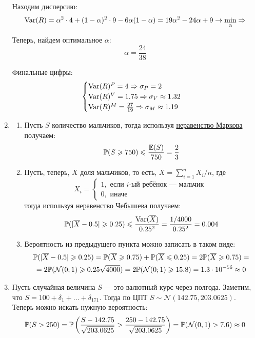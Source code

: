 \documentclass[12pt, a4paper]{article}\usepackage[]{graphicx}\usepackage[]{color}
\newcommand{\cN}{\mathcal{N}}
\begin{document}
\begin{enumerate}
Находим дисперсию:
\[
\operatorname{Var}(R) = \alpha^2 \cdot 4 + (1-\alpha)^2 \cdot 9 - 6\alpha (1-\alpha) = 19\alpha^2 -24\alpha + 9 \to \min_{\alpha} \Rightarrow
\]

Теперь, найдем оптимальное $\alpha$:
\[
\alpha = \frac{24}{38}
\]

Финальные цифры:
\[
\begin{cases}
\operatorname{Var}(R)^{P} = 4 \Rightarrow \sigma_{P} = 2 \\
\operatorname{Var}(R)^{V} = 1.75 \Rightarrow \sigma_{V} \approx 1.32 \\
\operatorname{Var}(R)^{M} = \frac{27}{19} \Rightarrow \sigma_{M} \approx 1.19 \\
\end{cases}
\]
\item
\begin{enumerate}
\item Пусть $S$ количество мальчиков, тогда используя \href{https://en.wikipedia.org/wiki/Markov%27s_inequality}{неравенство Маркова} получаем:
\[
\mathbb{P}(S \geqslant 750) \leqslant \frac{\mathbb{E}(S)}{750} = \frac{2}{3}
\]
\item Пусть, теперь, $\overline{X}$ доля мальчиков, то есть, $\overline{X} = \sum_{i=1}^n X_i /n$, где
\[
X_i =
\begin{cases}
1, \text{ если }i\text{-ый ребёнок — мальчик }\\
0, \text{ иначе }
\end{cases}
\]
тогда используя \href{https://en.wikipedia.org/wiki/Markov%27s_inequality}{неравенство Чебышева} получаем:
\[
\mathbb{P}(|\overline{X} - 0.5| \geqslant 0.25) \leqslant \frac{\operatorname{Var}(\overline{X})}{0.25^2} = \frac{1/4000}{0.25^2} = 0.004
\]
\item Вероятность из предыдущего пункта можно записать в таком виде:
\begin{multline*}
\P(|\overline{X} - 0.5| \ge 0.25) = \P(\overline{X} \ge 0.75) + \P(\overline{X} \le 0.25) = 2\P(\overline{X} \ge 0.75)=\\
= 2\P(\cN(0;1)\geq 0.25\sqrt{4000})=2\P(\cN(0;1)\geq 15.8) = 1.3 \cdot 10^{-56} \approx 0
\end{multline*}
\end{enumerate}
\item Пусть случайная величина $S$ —  это валютный курс через полгода. Заметим, что $S = 100 + \delta_1 + \ldots + \delta_{171}$.
Тогда по ЦПТ $S \sim \cN(142.75, 203.0625)$. Теперь можно искать нужную вероятность:
\[
\P(S > 250) = \P \left(\frac{S -  142.75}{\sqrt{203.0625}} > \frac{250-142.75}{\sqrt{203.0625}} \right) = \P(\cN(0, 1) > 7.6) \approx 0
\]
\end{enumerate}
\end{document}
